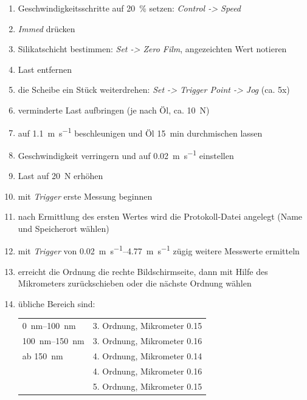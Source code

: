 \begin{appendices}
\begin{enumerate}
            \item Geschwindigkeitsschritte auf \SI{20}{\percent} setzen: \textit{Control -> Speed}
            \item \textit{Immed} drücken
            \item Silikatschicht bestimmen: \textit{Set -> Zero Film}, angezeichten Wert notieren
            \item Last entfernen
            \item die Scheibe ein Stück weiterdrehen: \textit{Set -> Trigger Point -> Jog} (ca. 5x)
            \item verminderte Last aufbringen (je nach Öl, ca. \SI{10}{\newton})
            \item auf \SI[per-mode=symbol]{1.1}{\meter\per\second} beschleunigen und Öl \SI{15}{\minute} durchmischen lassen
            \item Geschwindigkeit verringern und auf \SI[per-mode=symbol]{0.02}{\meter\per\second} einstellen
            \item Last auf \SI{20}{\newton} erhöhen
            \item mit \textit{Trigger} erste Messung beginnen
            \item nach Ermittlung des ersten Wertes wird die Protokoll-Datei angelegt (Name und Speicherort wählen)
            \item mit \textit{Trigger} von \SIrange[per-mode=symbol]{0.02}{4.77}{\meter\per\second} zügig weitere Messwerte ermitteln
            \item erreicht die Ordnung die rechte Bildschirmseite, dann mit Hilfe des Mikrometers zurückschieben oder die nächste Ordnung wählen
            \item übliche Bereich sind: \\
                \begin{tabular}{ll}
                    \SIrange{0}{100}{\nano\meter}       & 3. Ordnung, Mikrometer \num{0.15} \\
                        \SIrange{100}{150}{\nano\meter} & 3. Ordnung, Mikrometer \num{0.16} \\
                        ab \SI{150}{\nano\meter}        & 4. Ordnung, Mikrometer \num{0.14} \\
                                                        & 4. Ordnung, Mikrometer \num{0.16} \\
                                                        & 5. Ordnung, Mikrometer \num{0.15} \\
                \end{tabular}

\end{enumerate}
\end{appendices}
